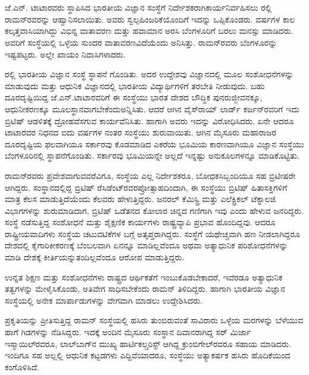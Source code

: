 
\chapter{}


ಜೆ.ಎನ್. ಟಾಟಾರವರು ಸ್ಥಾಪಿಸಿದ ಭಾರತೀಯ ವಿಜ್ಞಾನ ಸಂಸ್ಥೆಗೆ ನಿರ್ದೇಶಕರಾಗಿ\break ಕಾರ್ಯನಿರ್ವಹಿಸಲು ರಲ್ಲಿ ರಾಮನ್‍ರವರನ್ನು ಆಹ್ವಾನಿಸಲಾಯಿತು. ಅವರು ಸ್ವಲ್ಪ\break ಹಿಂಜರಿಕೆಯೊಂದಿಗೆ ಇದನ್ನು ಒಪ್ಪಿಕೊಂಡರು.  ವರ್ಷಗಳ ಕಾಲ ಕಲ್ಕತ್ತವಾಸಿಯಾಗಿದ್ದು ವಿಭಿನ್ನ ವಾತಾವರಣ ಮತ್ತು ಹವಾಮಾನ ಅರಸಿ ಬೆಂಗಳೂರಿಗೆ ಬರಲು ಮನಸ್ಸು ಮಾಡಿದರು. ಅವರಿಗೆ ಸಂಸ್ಥೆಯಲ್ಲಿ ಒಳ್ಳೆಯ ಸುಂದರ ವಾತಾವರಣವಿದೆಯೆಂದು ಅನಿಸಿತ್ತು. ರಾಮನ್‍ರವರು ಬೆಂಗಳೂರನ್ನು ಇಷ್ಟಪಟ್ಟರು. ಅಲ್ಲೇ ಖಾಯಂ ನಿವಾಸಿಗಳಾದರು.

ರಲ್ಲಿ ಭಾರತೀಯ ವಿಜ್ಞಾನ ಸಂಸ್ಥೆ ಸ್ಥಾಪನೆ ಗೊಂಡಿತು. ಅದರ ಉದ್ದೇಶವು ವಿಜ್ಞಾನದಲ್ಲಿ ಮೂಲ ಸಂಶೋಧನೆಗಳನ್ನು ಮಾಡುವುದು ಮತ್ತು ಆಧುನಿಕ ವಿಜ್ಞಾನದಲ್ಲಿ ಭಾರತೀಯ ವಿದ್ಯಾರ್ಥಿ\-ಗಳಿಗೆ ತರಬೇತಿ ನೀಡುವುದು. ಬಹು ದೂರದೃಷ್ಟಿಯಿದ್ದ ಜೆ.ಎನ್.ಟಾಟಾರವರಿಗೆ ಈ ಸಂಸ್ಥೆಯು ಭಾರತ ದೇಶದ ಬೌದ್ಧಿಕ ಪುನರುಜ್ಜೀವನಕ್ಕೂ, ಆಧುನೀಕರಣಕ್ಕೂ ಮೂಲಸ್ಥಾನವಾಗಬೇಕೆಂದು\break ಅನ್ನಿಸಿತು. ಆದರೆ ಆಗಿನ ವೈಸ್‍ರಾಯ್ ಲಾರ್ಡ್ ಕರ್ಜನ್‍ರವರಿಗೆ ಇದು ಬ್ರಿಟಿಷ್ ಆಡಳಿತಕ್ಕೆ ದ್ರೋಹವೆಸಗುವ ಕಾರ್ಯವೆನಿಸಿತು. ಹಾಗಾಗಿ ಅವರು ಇದನ್ನು ವಿರೋಧಿಸಿದರು. ಏನೇ ಆದರೂ ಟಾಟಾರವರ ನಿಧನದ ಐದು ವರ್ಷಗಳ ನಂತರ ಸಂಸ್ಥೆಯು ಶುರುವಾಯಿತು. ಆಗಿನ ಮೈಸೂರು ಮಹಾರಾಜರ ದೂರದೃಷ್ಟಿಯ ಫಲವಾಗಿಯೂ ಸರ್ಕಾರವು ಕೊಡಮಾಡಿದ  ಎಕರೆಯ ಭೂಮಿಯ ಕಾರಣವಾಗಿಯೂ ವಿಜ್ಞಾನ ಸಂಸ್ಥೆಯು ಬೆಂಗಳೂರಿನಲ್ಲಿ ಸ್ಥಾಪನೆಗೊಂಡಿತು. ಸರ್ಕಾರವು ಭೂಮಿಯನ್ನೇ ಅಲ್ಲದೆ ಇನ್ನಷ್ಟು ಅನುಕೂಲಗಳನ್ನೂ ಮಾಡಿಕೊಟ್ಟಿತು.

ರಾಮನ್‍ರವರು ಪ್ರವೇಶವಾಗುವವರೆವಿಗೂ, ಸಂಸ್ಥೆಯ ಎಲ್ಲ ನಿರ್ದೇಶಕರೂ, ಬೋಧಕ\break ಸಿಬ್ಬಂದಿಯೂ ಸಹ ಬ್ರಿಟೀಷರೇ ಆಗಿದ್ದರು. ಸಂಸ್ಥಾನದಲ್ಲಿದ್ದ ಬ್ರಿಟಿಷ್ ರೆಸಿಡೆಂಟ್‍ರವರ\break ಪ್ರೋತ್ಸಾಹದಿಂದಾಗಿ, ಈ ಸಂಸ್ಥೆಯು ಬ್ರಿಟಿಷ್ ಹಿತಾಸಕ್ತಿಗಳಿಗೆ ಮಾತ್ರ ಕೆಲಸ ಮಾಡುತ್ತಿದೆಯೆಂದು ಕೆಲವರು ಹೇಳುತ್ತಿದ್ದರು. ಜನರಲ್ ಕೆಮಿಸ್ಟ್ರಿ ಮತ್ತು ಎಲೆಕ್ಟ್ರಿಕಲ್ ಟೆಕ್ನಾಲಜಿ ವಿಭಾಗಗಳನ್ನು ಶುರುಮಾಡಿದಾಗ, ಬ್ರಿಟಿಷ್ ಒಡೆತನದ ಕೋಲಾರ ಚಿನ್ನದ ಗಣಿಗಾಗಿ ಇವು ಎಂದು ಹೇಳುವ ಜನರಿದ್ದರು. ಸಂಸ್ಥೆ ನಡೆಸುತ್ತಿದ್ದ ಸಂಶೋಧನೆ ಮತ್ತು ಶೈಕ್ಷಣಿಕ ಕಾರ್ಯಗಳು ರಾಷ್ಟ್ರವ್ಯಾಪಿ ಪ್ರಭಾವ ಹೊಂದಿದ್ದವು. ಆದರೂ ರಾಷ್ಟ್ರೀಯವಾದಿಗಳು ಸಂಸ್ಥೆಯ ಚಟುವಟಿಕೆಗಳ ಬಗ್ಗೆ ಅತೃಪ್ತರಾಗಿದ್ದರು. ಸಂಸ್ಥೆಗೆ ಯಥೇಚ್ಚವಾಗಿ ಹಣ ನೀಡಲಾಗಿದ್ದರೂ ದೇಶದಲ್ಲಿ ಕೈಗಾರಿಕೀಕರಣಕ್ಕೆ ಬೆಂಬಲವಾಗಿ ಏನನ್ನೂ ಮಾಡಿಲ್ಲವೆಂದೂ ಅಥವಾ ಅತ್ಯಾಧುನಿಕ ಪರಿಶೋಧನೆಗಳನ್ನು ಮಾಡಿ ದೇಶಕ್ಕೆ ಕೀರ್ತಿಯನ್ನು\break ತಂದಿಲ್ಲವೆಂದೂ ಆರೋಪ ಮಾಡುತ್ತಿದ್ದರು.

ಉನ್ನತ ಶಿಕ್ಷಣ ಮತ್ತು ಸಂಶೋಧನೆಗಳು ರಾಷ್ಟ್ರದ ಆರ್ಥಿಕತೆಗೆ ಇಂಬುಕೊಡಬೇಕಾದರೆ, ಇವೆರಡೂ ಅತ್ಯಾಧುನಿಕ ತತ್ವಗಳನ್ನು ಮೇಳೈಸಿಕೊಂಡು, ಅತಿವೇಗ ಸಾಧಿಸಬೇಕೆಂದು ರಾಮನ್ ತಿಳಿದಿದ್ದರು. ಹಾಗಾಗಿ ಭಾರತೀಯ ವಿಜ್ಞಾನ ಸಂಸ್ಥೆಯಲ್ಲಿ ಅನೇಕ ಮಾರ್ಪಾಡುಗಳನ್ನು ವೇಗವಾಗಿ ಮಾಡಲು ಉದ್ದೇಶಿಸಿದರು.

ಪ್ರಕೃತಿಯನ್ನು ಪ್ರೀತಿಸುತ್ತಿದ್ದ ರಾಮನ್ ಸಂಸ್ಥೆಯಲ್ಲಿ ಹಸಿರು ತುಂಬಿರುವಂತೆ ಸಾವಿರಾರು ಒಳ್ಳೆಯ ಮರಗಳನ್ನು ಬೆಳೆಯುವ ಹಾಗೆ ಗಿಡಗಳನ್ನು ನೆಡಿಸಿದ್ದರು. ಇದಕ್ಕೆ ಅಂದಿನ ಮೈಸೂರು ಸಂಸ್ಥಾನ ದಿವಾನರಾಗಿದ್ದ ಸರ್ ಮಿರ್ಜಾ ಇಸ್ಮಾಯಿಲ್‍ರವರೂ, ಲಾಲ್‍ಬಾಗ್‍ನ ಮುಖ್ಯ ಹಾರ್ಟಿಕಲ್ಚರಿಸ್ಟ್ ಆಗಿದ್ದ ಕ್ರುಂಬಿಗೇಲ್‍ರವರೂ ಸಹಾಯ ಮಾಡಿದರು. ಇಂದಿಗೂ ಸಹ ಅಲ್ಲಲ್ಲಿ ಆಧುನಿಕ ಕಟ್ಟಡಗಳು ಎದ್ದಿವೆಯಾದರೂ, ಸಂಸ್ಥೆಯು ಅತ್ಯಾಕರ್ಷಕ ಹಸಿರು ಹೊದಿಕೆಯಿಂದ ಕಂಗೊಳಿಸಿದೆ. 

